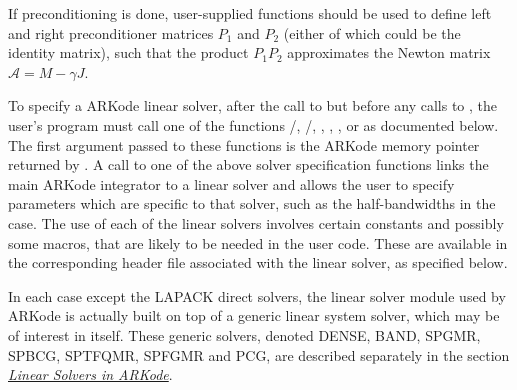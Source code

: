 \documentclass[letterpaper,10pt,english]{sphinxmanual}
\begin{document}
If preconditioning is done, user-supplied functions should be used to
define left and right preconditioner matrices $P_1$ and
$P_2$ (either of which could be the identity matrix), such that
the product $P_{1}P_{2}$ approximates the Newton matrix
${\mathcal A} = M - \gamma J$.

To specify a ARKode linear solver, after the call to
{\hyperref[c_interface/User_callable:ARKodeCreate]{}} but before any calls to {\hyperref[c_interface/User_callable:ARKode]{}},
the user's program must call one of the functions
{\hyperref[c_interface/User_callable:ARKDense]{}}/{\hyperref[c_interface/User_callable:ARKLapackDense]{}},
{\hyperref[c_interface/User_callable:ARKBand]{}}/{\hyperref[c_interface/User_callable:ARKLapackBand]{}},
{\hyperref[c_interface/User_callable:ARKSpgmr]{}}, {\hyperref[c_interface/User_callable:ARKSpbcg]{}}, {\hyperref[c_interface/User_callable:ARKSptfqmr]{}},
{\hyperref[c_interface/User_callable:ARKSpfgmr]{}} or {\hyperref[c_interface/User_callable:ARKPcg]{}} as documented below. The
first argument passed to these functions is the ARKode memory pointer
returned by {\hyperref[c_interface/User_callable:ARKodeCreate]{}}.  A call to one of the above
solver specification functions links the main ARKode integrator to a
linear solver and allows the user to specify parameters which are
specific to that solver, such as the half-bandwidths in the
{\hyperref[c_interface/User_callable:ARKBand]{}} case.  The use of each of the linear solvers
involves certain constants and possibly some macros, that are likely
to be needed in the user code. These are available in the
corresponding header file associated with the linear solver, as
specified below.

In each case except the LAPACK direct solvers, the linear solver
module used by ARKode is actually built on top of a generic linear
system solver, which may be of interest in itself.  These generic
solvers, denoted DENSE, BAND, SPGMR, SPBCG, SPTFQMR, SPFGMR and PCG,
are described separately in the section {\hyperref[linear_solvers/index:linearsolvers]{\emph{Linear Solvers in ARKode}}}.
\end{document}
